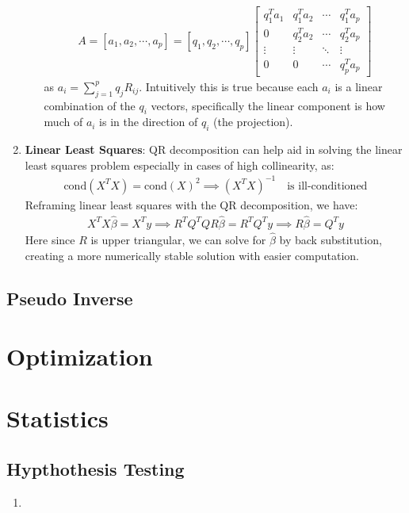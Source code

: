 \documentclass[letterpaper, 11pt]{article}
\newcommand{\1}{\mathds{1}}	%
\theoremstyle{definition}
\begin{document}
\begin{enumerate}
\begin{enumerate}
\begin{align}
            A = [a_1, a_2, \cdots, a_p] = [q_1, q_2, \cdots, q_p] \begin{bmatrix} q_1^T a_1 & q_1^T a_2 & \cdots & q_1^T a_p \\ 0 & q_2^T a_2 & \cdots & q_2^T a_p \\ \vdots & \vdots & \ddots & \vdots \\ 0 & 0 & \cdots & q_p^T a_p \end{bmatrix}
        \end{align}
        as $a_i = \sum_{j=1}^{p} q_j R_{ij}$. Intuitively this is true because each $a_i$ is a linear combination of the $q_i$ vectors, specifically
        the linear component is how much of $a_i$ is in the direction of $q_i$ (the projection).
    \end{enumerate}
    \item \textbf{Linear Least Squares}: QR decomposition can help aid in solving the linear least squares problem 
    especially in cases of high collinearity, as:
    \begin{align}
        \text{cond}(X^T X) = \text{cond}(X)^2 \implies (X^T X)^{-1} \quad \text{is ill-conditioned}
    \end{align} 
    Reframing linear least squares with the QR decomposition, we have:
    \begin{align}
        X^T X \hat{\beta} = X^T y \implies R^T Q^T Q R \hat{\beta} = R^T Q^T y \implies R \hat{\beta} = Q^T y
    \end{align}
    Here since $R$ is upper triangular, we can solve for $\hat{\beta}$ by back substitution, 
    creating a more numerically stable solution with easier computation.
     
\end{enumerate}

\subsection{Pseudo Inverse}

\section{Optimization}

\section{Statistics}
\subsection{Hypthothesis Testing}
\begin{enumerate}
    \item 
\end{enumerate}
\end{document}
